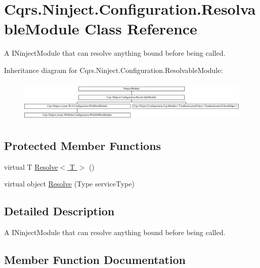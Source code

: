 \hypertarget{classCqrs_1_1Ninject_1_1Configuration_1_1ResolvableModule}{}\section{Cqrs.\+Ninject.\+Configuration.\+Resolvable\+Module Class Reference}
\label{classCqrs_1_1Ninject_1_1Configuration_1_1ResolvableModule}


A I\+Ninject\+Module that can resolve anything bound before being called.  


Inheritance diagram for Cqrs.\+Ninject.\+Configuration.\+Resolvable\+Module\+:\begin{figure}[H]
\begin{center}
\leavevmode
\includegraphics[height=2.021661cm]{classCqrs_1_1Ninject_1_1Configuration_1_1ResolvableModule}
\end{center}
\end{figure}
\subsection*{Protected Member Functions}
\begin{DoxyCompactItemize}
\item 
virtual T \hyperlink{classCqrs_1_1Ninject_1_1Configuration_1_1ResolvableModule_a41a1826cee70c7627e6ec1ef0053f1ea_a41a1826cee70c7627e6ec1ef0053f1ea}{Resolve$<$ T $>$} ()
\item 
virtual object \hyperlink{classCqrs_1_1Ninject_1_1Configuration_1_1ResolvableModule_ad0851fd40b9e9ef25f345280b8cae1f0_ad0851fd40b9e9ef25f345280b8cae1f0}{Resolve} (Type service\+Type)
\end{DoxyCompactItemize}


\subsection{Detailed Description}
A I\+Ninject\+Module that can resolve anything bound before being called. 



\subsection{Member Function Documentation}
\mbox{\label{classCqrs_1_1Ninject_1_1Configuration_1_1ResolvableModule_ad0851fd40b9e9ef25f345280b8cae1f0_ad0851fd40b9e9ef25f345280b8cae1f0}} 
